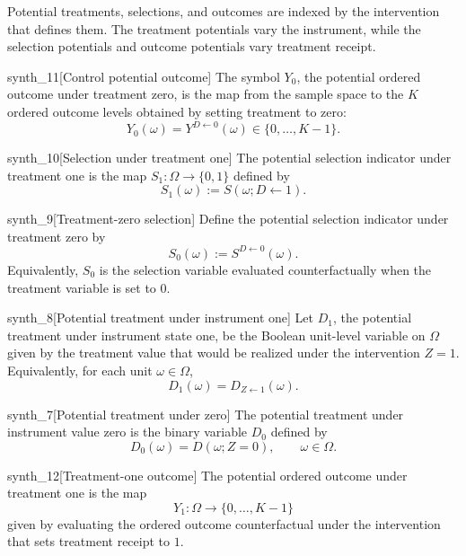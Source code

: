 Potential treatments, selections, and outcomes are indexed by the intervention that defines them. The treatment potentials  vary the instrument, while the selection potentials  and outcome potentials  vary treatment receipt.

\begin{definitionv}{synth_11}[Control potential outcome]
The symbol \(Y_0\), the potential ordered outcome under treatment zero, is the map from the sample space to the \(K\) ordered outcome levels obtained by setting treatment to zero:
\[
Y_0(\omega)=Y^{D\leftarrow 0}(\omega)\in\{0,\ldots,K-1\}.
\]
\end{definitionv}

\begin{definitionv}{synth_10}[Selection under treatment one]
The potential selection indicator under treatment one is the map \(S_1:\Omega\to\{0,1\}\) defined by
\[
S_1(\omega) := S(\omega; D\leftarrow 1).
\]
\end{definitionv}

\begin{definitionv}{synth_9}[Treatment-zero selection]
Define the potential selection indicator under treatment zero by
\[
S_0(\omega) := S^{D \leftarrow 0}(\omega).
\]
Equivalently, \(S_0\) is the selection variable evaluated counterfactually when the treatment variable is set to \(0\).
\end{definitionv}

\begin{definitionv}{synth_8}[Potential treatment under instrument one]
Let \(D_1\), the potential treatment under instrument state one, be the Boolean unit-level variable on \(\Omega\) given by the treatment value that would be realized under the intervention \(Z=1\). Equivalently, for each unit \(\omega\in\Omega\),
\[
D_1(\omega)=D_{Z\leftarrow 1}(\omega).
\]
\end{definitionv}

\begin{definitionv}{synth_7}[Potential treatment under zero]
The potential treatment under instrument value zero is the binary variable \(D_0\) defined by
\[
D_0(\omega)=D(\omega; Z=0),\qquad \omega\in\Omega.
\]
\end{definitionv}

\begin{definitionv}{synth_12}[Treatment-one outcome]
The potential ordered outcome under treatment one is the map
\[
Y_1:\Omega\to\{0,\ldots,K-1\}
\]
given by evaluating the ordered outcome counterfactual under the intervention that sets treatment receipt to \(1\).
\end{definitionv}

